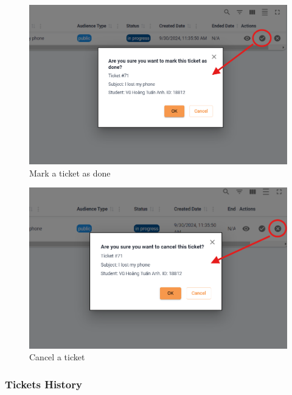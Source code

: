 	
	\begin{figure}[H]
		\centering
		\includegraphics[width=0.7\linewidth]{graphics/gui/staff/ticket-handling-done}
		\caption{Mark a ticket as done}
		\label{fig:gui-st-ticket-handling-done}
	\end{figure}
	
	\begin{figure}[H]
		\centering
		\includegraphics[width=0.7\linewidth]{graphics/gui/staff/ticket-handling-cancel}
		\caption{Cancel a ticket}
		\label{fig:gui-st-ticket-handling-cancel}
	\end{figure}
	
	
	
	
	\subsubsection{Tickets History}
	
